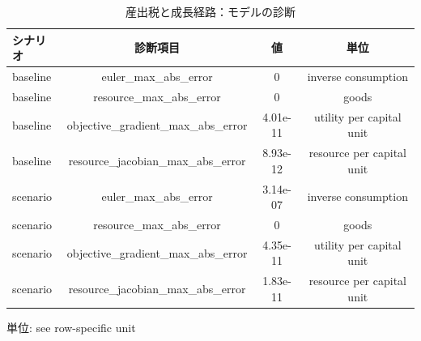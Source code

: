\begingroup
\begin{table}[htbp]
\centering
\caption{産出税と成長経路：モデルの診断}
\label{tab:specialist-growth-r01-displays-model_fit}
\begin{tabular}{lccc}
\toprule
シナリオ & 診断項目 & 値 & 単位 \\
\midrule
baseline & euler\_max\_abs\_error & 0 & inverse consumption \\
baseline & resource\_max\_abs\_error & 0 & goods \\
baseline & objective\_gradient\_max\_abs\_error & 4.01e-11 & utility per capital unit \\
baseline & resource\_jacobian\_max\_abs\_error & 8.93e-12 & resource per capital unit \\
scenario & euler\_max\_abs\_error & 3.14e-07 & inverse consumption \\
scenario & resource\_max\_abs\_error & 0 & goods \\
scenario & objective\_gradient\_max\_abs\_error & 4.35e-11 & utility per capital unit \\
scenario & resource\_jacobian\_max\_abs\_error & 1.83e-11 & resource per capital unit \\
\bottomrule
\end{tabular}
\par\medskip\begin{minipage}{\linewidth}\footnotesize
単位: see row-specific unit
\end{minipage}
\end{table}
\endgroup

